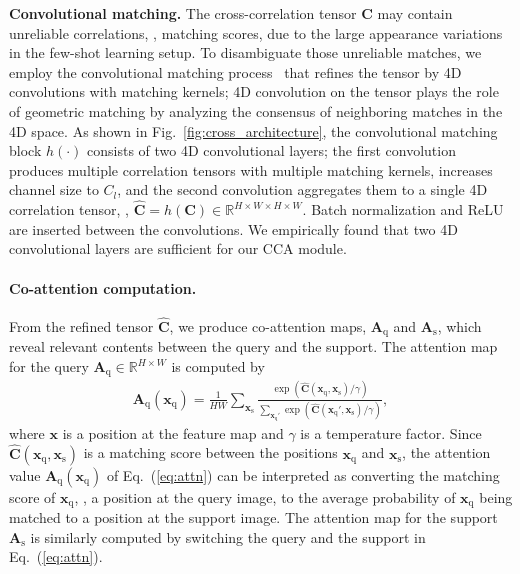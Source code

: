 \documentclass[10pt,twocolumn,letterpaper]{article}
\newcommand{\Real}{\mathbb{R}}
\newcommand{\bC}{\mathbf{C}}
\newcommand{\bA}{\mathbf{A}}
\newcommand{\bx}{\mathbf{x}}
\newcommand{\texts}{{\text{s}}}
\newcommand{\textq}{{\text{q}}}
\newcommand{\abbcross}{CCA\xspace}
\newcommand{\smallbreakparagraph}[1]{\smallbreak \noindent \textbf{#1}}
\begin{document}
\smallbreakparagraph{Convolutional matching.}
The cross-correlation tensor $\bC$ may contain unreliable correlations, \ie, matching scores, due to the large appearance variations in the few-shot learning setup. 
To disambiguate those unreliable matches, we employ the convolutional matching process~\cite{ncnet,chm} that refines the tensor by 4D convolutions with  matching kernels; 4D convolution on the tensor plays the role of geometric matching by analyzing the consensus of neighboring matches in the 4D space.
As shown in Fig.~\ref{fig:cross_architecture}, the convolutional matching block $h(\cdot)$ consists of two 4D convolutional layers; the first convolution produces multiple correlation tensors with multiple matching kernels, increases channel size to $C_l$, and the second convolution aggregates them to a single 4D correlation tensor, \ie, $\hat{\bC} = h(\bC) \in \Real^{H\times W \times H \times W }$. 
Batch normalization and ReLU are inserted between the convolutions.
We empirically found that two 4D convolutional layers are sufficient for our \abbcross module.











\paragraph{Co-attention computation.}
From the refined tensor $\hat{\bC}$, we produce co-attention maps, $\bA_\textq$ and $\bA_\texts$, which reveal relevant contents between the query and the support.
The attention map for the query $\bA_\textq \in \Real^{H \times W}$ is computed by
\begin{eqnarray}
	\bA_\textq(\bx_\textq) = \frac{1}{H W}\sum_{\bx_\texts} \frac{\exp{(\hat{\bC}(\bx_\textq, \bx_\texts) / \gamma)} }{\sum_{\bx_\textq'}
	\exp{(\hat{\bC}(\bx_\textq', \bx_\texts) / \gamma)}},\label{eq:attn}
\end{eqnarray}
where $\bx$ is a position at the feature map and $\gamma$ is a temperature factor.
Since $\hat{\bC}(\bx_\textq, \bx_\texts)$ is a matching score between the positions $\bx_\textq$ and $\bx_\texts$, the attention value $\bA_\textq(\bx_\textq)$ of Eq.~(\ref{eq:attn}) can be interpreted as converting the matching score of  $\bx_\textq$, \ie, a position at the query image, to the average probability of $\bx_\textq$ being matched to a position at the support image.
The attention map for the support $\bA_\texts$ is similarly computed by switching the query and the support in Eq.~(\ref{eq:attn}).
\end{document}
